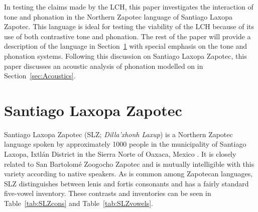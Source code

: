 \documentclass[12pt, letterpaper]{article}
\begin{document}
In testing the claims made by the LCH, this paper investigates the interaction of tone and phonation in the Northern Zapotec language of Santiago Laxopa Zapotec. This language is ideal for testing the viability of the LCH because of its use of both contrastive tone and phonation. The rest of the paper will provide a description of the language in Section~\ref{sec:SLZ} with special emphasis on the tone and phonation systems. Following this discussion on Santiago Laxopa Zapotec, this paper discusses an acoustic analysis of phonation modelled on \citet{espositoVariationContrastivePhonation2010,garellekAcousticConsequencesPhonation2011,dicanioCoarticulationToneGlottal2012} in Section~\ref{sec:Acoustics}.

\section{Santiago Laxopa Zapotec} \label{sec:SLZ}

Santiago Laxopa Zapotec (SLZ; \textit{Dilla'xhonh Laxup}) is a Northern Zapotec language spoken by approximately 1000 people in the municipality of Santiago Laxopa, Ixtlán District in the Sierra Norte of Oaxaca, Mexico \citep{adlerAcousticsPhonationTypes2016,adlerDerivationVerbInitiality2018,foleyForbiddenCliticClusters2018,foleyExtendingPersonCaseConstraint2020}. It is closely related to San Bartolomé Zoogocho Zapotec \citep{longDiccionarioZapotecoSan2005,sonnenscheinDescriptiveGrammarSan2005} and is mutually intelligible with this variety according to native speakers.  As is common among Zapotecan languages, SLZ distinguishes between lenis and fortis consonants \citep[e.g.,][]{nellisFortisLenisCajonos1980,jaegerFortisLenisQuestion1983,uchiharaFortisLenisGlides2016} and has a fairly standard five-vowel inventory. These contrasts and inventories can be seen in Table~\ref{tab:SLZcons} and Table~\ref{tab:SLZvowels}.
\end{document}
